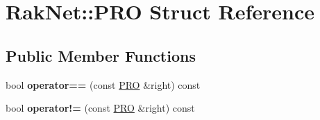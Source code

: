 \hypertarget{struct_rak_net_1_1_p_r_o}{\section{Rak\-Net\-:\-:P\-R\-O Struct Reference}
\label{struct_rak_net_1_1_p_r_o}
}
\subsection*{Public Member Functions}
\begin{DoxyCompactItemize}
\item 
\hypertarget{struct_rak_net_1_1_p_r_o_a01746adb5847c39edeb961b90f6b6c99}{bool {\bfseries operator==} (const \hyperlink{struct_rak_net_1_1_p_r_o}{P\-R\-O} \&right) const }\label{struct_rak_net_1_1_p_r_o_a01746adb5847c39edeb961b90f6b6c99}

\item 
\hypertarget{struct_rak_net_1_1_p_r_o_a0b0ccdde218ca0e915859399dda0770d}{bool {\bfseries operator!=} (const \hyperlink{struct_rak_net_1_1_p_r_o}{P\-R\-O} \&right) const }\label{struct_rak_net_1_1_p_r_o_a0b0ccdde218ca0e915859399dda0770d}

\end{DoxyCompactItemize}
